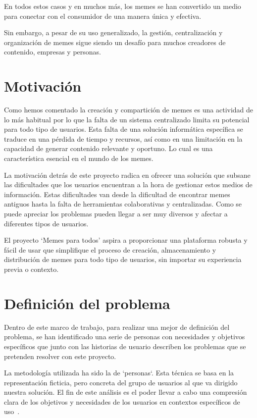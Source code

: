 En todos estos casos y en muchos más, los memes se han convertido un medio para conectar con el consumidor de una manera única y efectiva.

Sin embargo, a pesar de su uso generalizado, la gestión, centralización y organización de memes sigue siendo un desafío para muchos creadores de contenido, empresas y personas.

\section{Motivación}

Como hemos comentado la creación y compartición de memes es una actividad de lo más habitual por lo que la falta de un sistema centralizado limita su potencial para todo tipo de usuarios. Esta falta de una solución informática específica se traduce en una pérdida de tiempo y recursos, así como en una limitación en la capacidad de generar contenido relevante y oportuno. Lo cual es una característica esencial en el mundo de los memes.

La motivación detrás de este proyecto radica en ofrecer una solución que subsane las dificultades que los usuarios encuentran a la hora de gestionar estos medios de información. Estas dificultades van desde la dificultad de encontrar memes antiguos hasta la falta de herramientas colaborativas y centralizadas. Como se puede apreciar los problemas pueden llegar a ser muy diversos y afectar a diferentes tipos de usuarios.

El proyecto `Memes para todos' aspira a proporcionar una plataforma robusta y fácil de usar que simplifique el proceso de creación, almacenamiento y distribución de memes para todo tipo de usuarios, sin importar su experiencia previa o contexto.

\section{Definición del problema}

Dentro de este marco de trabajo, para realizar una mejor de definición del problema, se han identificado una serie de personas con necesidades y objetivos específicos que junto con las historias de usuario describen los problemas que se pretenden resolver con este proyecto.

La metodología utilizada ha sido la de `personas`. Esta técnica se basa en la representación ficticia, pero concreta del grupo de usuarios al que va dirigido nuestra solución. El fin de este análisis es el poder llevar a cabo una compresión clara de los objetivos y necesidades de los usuarios en contextos específicos de uso~\cite{cooper2014face}.

